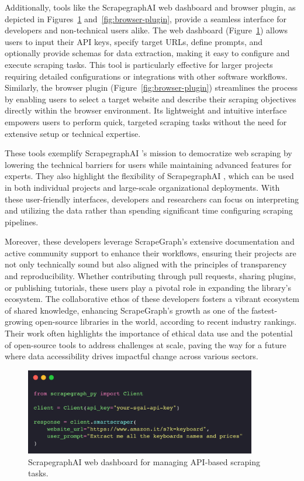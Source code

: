 Additionally, tools like the ScrapegraphAI web dashboard and browser plugin, as depicted in Figures~\ref{fig:web-dashboard} and~\ref{fig:browser-plugin}, provide a seamless interface for developers and non-technical users alike. The web dashboard (Figure~\ref{fig:web-dashboard}) allows users to input their API keys, specify target URLs, define prompts, and optionally provide schemas for data extraction, making it easy to configure and execute scraping tasks. This tool is particularly effective for larger projects requiring detailed configurations or integrations with other software workflows. Similarly, the browser plugin (Figure~\ref{fig:browser-plugin}) streamlines the process by enabling users to select a target website and describe their scraping objectives directly within the browser environment. Its lightweight and intuitive interface empowers users to perform quick, targeted scraping tasks without the need for extensive setup or technical expertise.

These tools exemplify ScrapegraphAI 's mission to democratize web scraping by lowering the technical barriers for users while maintaining advanced features for experts. They also highlight the flexibility of ScrapegraphAI , which can be used in both individual projects and large-scale organizational deployments. With these user-friendly interfaces, developers and researchers can focus on interpreting and utilizing the data rather than spending significant time configuring scraping pipelines.

Moreover, these developers leverage ScrapeGraph’s extensive documentation and active community support to enhance their workflows, ensuring their projects are not only technically sound but also aligned with the principles of transparency and reproducibility. Whether contributing through pull requests, sharing plugins, or publishing tutorials, these users play a pivotal role in expanding the library’s ecosystem. The collaborative ethos of these developers fosters a vibrant ecosystem of shared knowledge, enhancing ScrapeGraph's growth as one of the fastest-growing open-source libraries in the world, according to recent industry rankings. Their work often highlights the importance of ethical data use and the potential of open-source tools to address challenges at scale, paving the way for a future where data accessibility drives impactful change across various sectors.



\begin{figure}[h!]
    \centering
    \includegraphics[width=0.9\textwidth]{Assets/API.png}
    \caption{ScrapegraphAI web dashboard for managing API-based scraping tasks.}
    \label{fig:web-dashboard}
\end{figure}

